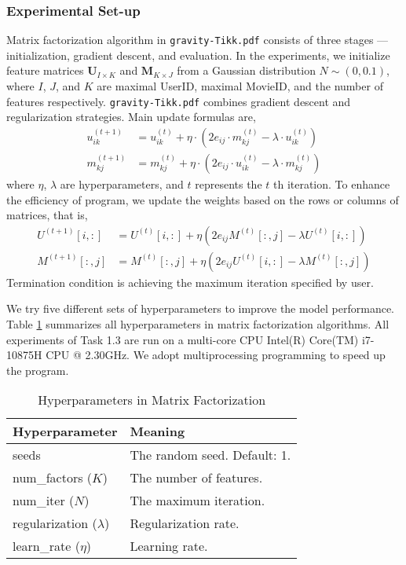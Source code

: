 \documentclass[12pt]{article}
\begin{document}
\subsubsection{Experimental Set-up}
Matrix factorization algorithm in \texttt{gravity-Tikk.pdf} consists of three stages --- initialization, gradient descent, and evaluation. In the experiments, we initialize feature matrices $\mathbf{U}_{I\times K}$ and $\mathbf{M}_{K\times J}$ from a Gaussian distribution $N\sim (0, 0.1)$, where $I$, $J$, and $K$ are maximal UserID, maximal MovieID, and the number of features respectively. \texttt{gravity-Tikk.pdf} combines gradient descent and regularization strategies. Main update formulas are,
\begin{align*}
    u_{ik}^{(t+1)} &= u_{ik}^{(t)} + \eta\cdot\left( 2e_{ij}\cdot m_{kj}^{(t)} - \lambda\cdot u_{ik}^{(t)} \right) \\
    m_{kj}^{(t+1)} &= m_{kj}^{(t)} + \eta\cdot\left( 2e_{ij}\cdot u_{ik}^{(t)} - \lambda \cdot m_{kj}^{(t)} \right) 
\end{align*}
where $\eta$, $\lambda$ are hyperparameters, and $t$ represents the $t$ th iteration. To enhance the efficiency of program, we update the weights based on the rows or columns of matrices, that is,
\begin{align*}
    U^{(t+1)}[i, :] &= U^{(t)}[i, :] + \eta\left( 2e_{ij}M^{(t)}[:, j] - \lambda U^{(t)}[i, :] \right) \\
    M^{(t+1)}[:, j] &= M^{(t)}[:, j] + \eta\left( 2e_{ij}U^{(t)}[i, :] - \lambda M^{(t)}[:, j] \right) 
\end{align*}
Termination condition is achieving the maximum iteration specified by user.\par
We try five different sets of hyperparameters to improve the model performance. Table \ref{tab:1.3-hyper} summarizes all hyperparameters in matrix factorization algorithms. All experiments of Task 1.3 are run on a multi-core CPU Intel(R) Core(TM) i7-10875H CPU @ 2.30GHz. We adopt multiprocessing programming to speed up the program.
\begin{table}[ht]
    \centering
    \caption{Hyperparameters in Matrix Factorization}
    \label{tab:1.3-hyper}
    \begin{tabular}{ll}
        \toprule
        \textbf{Hyperparameter} & \textbf{Meaning}\\
        \midrule
        seeds & The random seed. Default: 1.\\
        num\_factors ($K$) & The number of features.\\
        num\_iter ($N$) & The maximum iteration.\\
        regularization ($\lambda$) & Regularization rate.\\
        learn\_rate ($\eta$) & Learning rate.\\
        \bottomrule
    \end{tabular}
\end{table}
\end{document}
